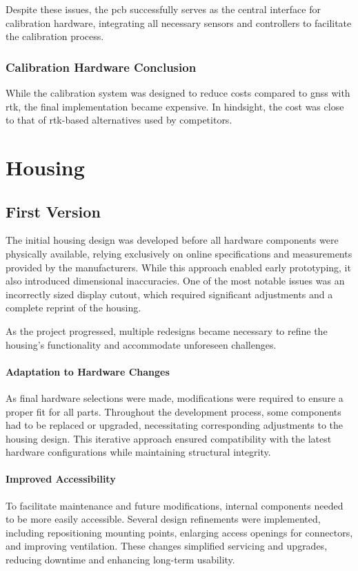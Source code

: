 Despite these issues, the \acrshort{pcb} successfully serves as the central interface for calibration hardware, integrating all necessary sensors and controllers to facilitate the calibration process.

\subsubsection*{Calibration Hardware Conclusion}
While the calibration system was designed to reduce costs compared to \acrshort{gnss} with \acrshort{rtk}, the final implementation became expensive. In hindsight, the cost was close to that of \acrshort{rtk}-based alternatives used by competitors.

\section{Housing}
\subsection{First Version}  

The initial housing design was developed before all hardware components were physically available, relying exclusively on online specifications and measurements provided by the manufacturers. While this approach enabled early prototyping, it also introduced dimensional inaccuracies. One of the most notable issues was an incorrectly sized display cutout, which required significant adjustments and a complete reprint of the housing.  

As the project progressed, multiple redesigns became necessary to refine the housing’s functionality and accommodate unforeseen challenges.

\paragraph{Adaptation to Hardware Changes}  
As final hardware selections were made, modifications were required to ensure a proper fit for all parts. Throughout the development process, some components had to be replaced or upgraded, necessitating corresponding adjustments to the housing design. This iterative approach ensured compatibility with the latest hardware configurations while maintaining structural integrity.  

\paragraph{Improved Accessibility}  
To facilitate maintenance and future modifications, internal components needed to be more easily accessible. Several design refinements were implemented, including repositioning mounting points, enlarging access openings for connectors, and improving ventilation. These changes simplified servicing and upgrades, reducing downtime and enhancing long-term usability.  

